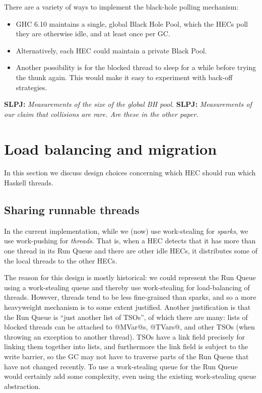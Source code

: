 \documentclass[twocolumn,9pt]{sigplanconf}
\newcommand{\spj}[1]{{{\bf SLPJ:} \sl #1}}
\begin{document}
There are a variety of ways to implement the black-hole polling mechanism:
\begin{itemize}
\item GHC 6.10 maintains a single, global Black Hole Pool, which 
the HECs poll they are otherwise idle, and at least once per GC.
\item Alternatively, each HEC could maintain a private Black Pool.
\item Another possibility is for the blocked thread to sleep for a while
  before trying the thunk again. This would make it easy to experiment
  with back-off strategies.
\end{itemize}

\spj{Measurements of the size of the global BH pool.}
\spj{Measurements of our claim that collisions are rare.  Are these in the other
paper.}


\section{Load balancing and migration} \label{s:load-balancing}

In this section we discuss design choices concerning which HEC should
run which Haskell threads.

\subsection{Sharing runnable threads}

In the current implementation, while we (now) use work-stealing for \emph{sparks},
we use work-pushing for \emph{threads}.  That is, when a HEC detects that it
has more than one thread in its Run Queue and there are other idle
HECs, it distributes some of the local threads to the other HECs.  

The reason for this design is mostly historical: we could represent
the Run Queue using a work-stealing queue and thereby use work-stealing
for load-balancing of threads.  However, threads tend to be less
fine-grained than sparks, and so a more heavyweight mechanism is to
some extent justified.  Another justification is that the Run Queue is
``just another list of TSOs'', of which there are many: lists of
blocked threads can be attached to @MVar@s, @TVars@, and other TSOs
(when throwing an exception to another thread).  TSOs have a link
field precisely for linking them together into lists, and furthermore
the link field is subject to the write barrier, so the GC may not have
to traverse parts of the Run Queue that have not changed recently.  To
use a work-stealing queue for the Run Queue would certainly add some
complexity, even using the existing work-stealing queue abstraction.
\end{document}
